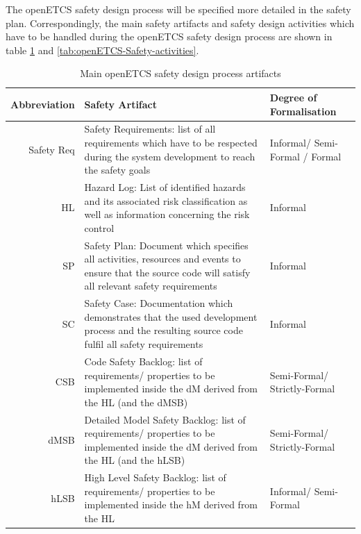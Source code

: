 \documentclass{template/openetcs_report}
\begin{document}
The openETCS safety design process will be specified more detailed in the safety plan. Correspondingly, the main safety artifacts and safety design activities which have to be handled during the openETCS safety design process are shown in table \ref{tab:openETCS-Safety-artifacts} and \ref{tab:openETCS-Safety-activities}.

\begin{table}[htbp]
  \centering
  \caption{Main openETCS safety design process artifacts}
    \begin{tabular}{r|p{8cm}|p{4cm}}
    \textbf{Abbreviation} & \textbf{Safety Artifact} & \textbf{Degree of Formalisation}\\
    \hline
    Safety Req & Safety Requirements: list of all requirements which have to be respected during the system development to reach the safety goals & Informal/ Semi-Formal / Formal \\
    HL    & Hazard Log: List of identified hazards and its associated risk classification as well as information concerning the risk control & Informal \\
    SP    & Safety Plan: Document which specifies all activities, resources and events to ensure that the source code will satisfy all relevant safety requirements & Informal \\
    SC    & Safety Case: Documentation which demonstrates that the used development process and the resulting source code fulfil all safety requirements & Informal \\
    CSB   & Code Safety Backlog: list of requirements/ properties to be implemented inside the dM derived from  the HL (and the dMSB) & Semi-Formal/ Strictly-Formal \\
    dMSB  & Detailed Model Safety Backlog: list of requirements/ properties to be implemented inside the dM derived from the HL (and  the hLSB) & Semi-Formal/ Strictly-Formal \\
    hLSB  & High Level Safety Backlog: list of requirements/ properties to be implemented inside the hM derived from the HL & Informal/ Semi-Formal \\
    \end{tabular}%
  \label{tab:openETCS-Safety-artifacts}%
\end{table}%
\end{document}
